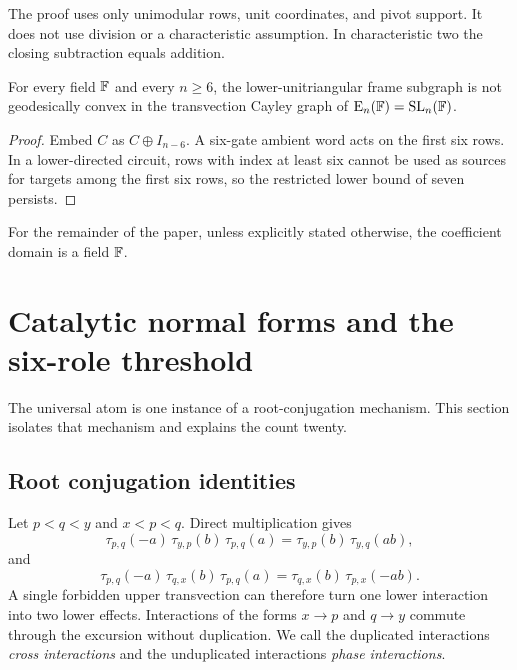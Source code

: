 \begin{remark}
The proof uses only unimodular rows, unit coordinates, and pivot support.  It does not use division or a characteristic assumption.  In characteristic two the closing subtraction equals addition.
\end{remark}

\begin{corollary}\label{cor:nonconvex}
For every field $\mathbb F$ and every $n\ge6$, the lower-unitriangular frame subgraph is not geodesically convex in the transvection Cayley graph of $\operatorname{E}_n(\mathbb F)=\operatorname{SL}_n(\mathbb F)$.
\end{corollary}

\begin{proof}
Embed $C$ as $C\oplus I_{n-6}$.  A six-gate ambient word acts on the first six rows.  In a lower-directed circuit, rows with index at least six cannot be used as sources for targets among the first six rows, so the restricted lower bound of seven persists.
\end{proof}

For the remainder of the paper, unless explicitly stated otherwise, the coefficient domain is a field $\mathbb F$.

\section{Catalytic normal forms and the six-role threshold}\label{sec:catalysis}

The universal atom is one instance of a root-conjugation mechanism.  This section isolates that mechanism and explains the count twenty.

\subsection{Root conjugation identities}

Let $p<q<y$ and $x<p<q$.  Direct multiplication gives
\begin{equation}\label{eq:read-conjugation}
\tau_{p,q}(-a)\,\tau_{y,p}(b)\,\tau_{p,q}(a)
=
\tau_{y,p}(b)\,\tau_{y,q}(ab),
\end{equation}
and
\begin{equation}\label{eq:update-conjugation}
\tau_{p,q}(-a)\,\tau_{q,x}(b)\,\tau_{p,q}(a)
=
\tau_{q,x}(b)\,\tau_{p,x}(-ab).
\end{equation}
A single forbidden upper transvection can therefore turn one lower interaction into two lower effects.  Interactions of the forms $x\to p$ and $q\to y$ commute through the excursion without duplication.  We call the duplicated interactions \emph{cross interactions} and the unduplicated interactions \emph{phase interactions}.

